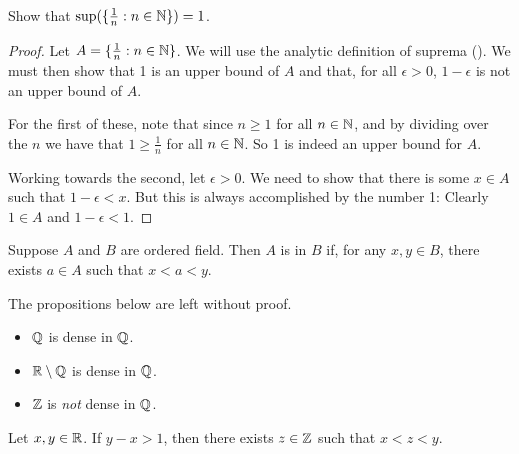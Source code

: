\documentclass[11pt,twoside=off,numbers=noenddot]{scrbook}
\begin{document}
\begin{example}
  Show that $\sup(\{ \frac{1}{n} : n \in \mathbb N \}) = 1$.
  \begin{proof}
    Let $A = \{ \frac{1}{n} : n \in \mathbb N \}$. We will use the analytic
    definition of suprema (). We must
    then show that 1 is an upper bound of $A$ and that, for all
    $\epsilon > 0$, $1 - \epsilon$ is not an upper bound of $A$.

    For the first of these, note that since $n \geq 1$ for all $n \in
    \mathbb N$, and by dividing over the $n$ we have that $1 \geq
    \frac{1}{n}$ for all $n \in \mathbb N$. So 1 is indeed an upper bound for $A$.

    Working towards the second, let $\epsilon > 0$. We need to show
    that there is some $x \in A$ such that $1 - \epsilon < x$. But
    this is always accomplished by the number 1: Clearly $1 \in A$
    and $1 - \epsilon < 1$.
  \end{proof}
\end{example}

\begin{definition}[Density]
  Suppose $A$ and $B$ are ordered field. Then $A$ is  in
  $B$ if, for any $x, y \in B$, there exists $a \in A$ such that $x < a < y$.
\end{definition}

\begin{example}
  The propositions below are left without proof.
  \begin{itemize}
    \item $\mathbb Q$ is dense in $\mathbb Q$.
    \item $\mathbb R \setminus \mathbb Q$ is dense in $\mathbb Q$.
    \item $\mathbb Z$ is \textit{not} dense in $\mathbb Q$.
  \end{itemize}
\end{example}

\begin{lemma}
  Let $x, y \in \mathbb R$. If $y - x > 1$, then there exists $z \in \mathbb Z$
  such that $x < z < y$.
\end{lemma}
\end{document}
